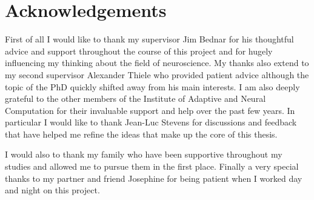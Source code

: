 


\begingroup

\let\clearpage\relax
\let\cleardoublepage\relax
\let\cleardoublepage\relax

\chapter*{Acknowledgements} %

First of all I would like to thank my supervisor Jim Bednar for his
thoughtful advice and support throughout the course of this project
and for hugely influencing my thinking about the field of neuroscience. My
thanks also extend to my second supervisor Alexander Thiele who
provided patient advice although the topic of the PhD quickly shifted
away from his main interests. I am also deeply grateful to the other
members of the Institute of Adaptive and Neural Computation for their
invaluable support and help over the past few years. In particular I
would like to thank Jean-Luc Stevens for discussions and feedback that
have helped me refine the ideas that make up the core of this thesis.

I would also to thank my family who have been supportive throughout my
studies and allowed me to pursue them in the first place. Finally a
very special thanks to my partner and friend Josephine for being
patient when I worked day and night on this project.

\endgroup
